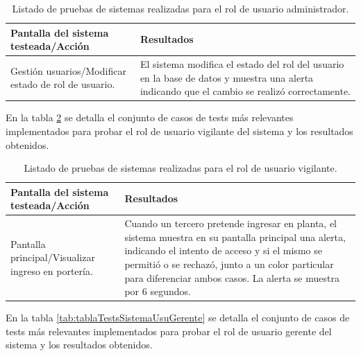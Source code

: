 \begin{table}[h]
	\centering
	\caption[Tipos de pruebas sistema]{Listado de pruebas de sistemas realizadas para el rol de usuario administrador.}
	\begin{tabular}{ p{4cm} p{8.5cm}} 	

		\toprule
		\textbf{Pantalla del sistema testeada/Acción} & 
		\textbf{Resultados} 
		\\
		\midrule
Gestión usuarios/Modificar estado de rol de usuario.  & El sistema modifica el estado del rol del usuario en la base de datos y muestra una alerta indicando que el cambio se realizó correctamente.  \\
		\bottomrule
		\hline
	\end{tabular}
	\label{tab:tablaTestsSistemaUsuAdmin}
\end{table}

En la tabla  \ref{tab:tablaTestsSistemaUsuPorteria} se detalla el conjunto de casos de tests más relevantes implementados para probar el rol de usuario vigilante del sistema y los resultados obtenidos. 

\begin{table}[h]
	\centering
	\caption[Tipos de pruebas sistema]{Listado de pruebas de sistemas realizadas para el rol de usuario vigilante.}
	\begin{tabular}{ p{4cm} p{8.5cm}} 	

		\toprule
		\textbf{Pantalla del sistema testeada/Acción} & 
		\textbf{Resultados} 
		\\
		\midrule
Pantalla principal/Visualizar ingreso en portería.  & Cuando un tercero pretende ingresar en planta, el sistema muestra en su pantalla principal una alerta, indicando el intento de acceso y si el mismo se permitió o se rechazó, junto a un color particular para diferenciar ambos casos. La alerta se muestra por 6 segundos. \\
		\bottomrule
		\hline
	\end{tabular}
	\label{tab:tablaTestsSistemaUsuPorteria}
\end{table}


En la tabla  \ref{tab:tablaTestsSistemaUsuGerente} se detalla el conjunto de casos de tests más relevantes implementados para probar el rol de usuario gerente del sistema y los resultados obtenidos. 


